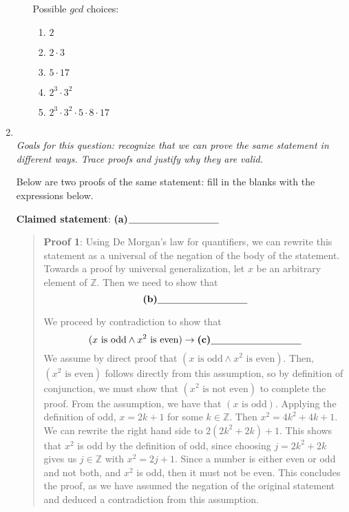 \documentclass[12pt, oneside]{article}
\begin{document}
\begin{enumerate}
\begin{enumerate}
Possible $gcd$ choices:
\begin{enumerate}
\item $2$
\item $2 \cdot 3$
\item $5 \cdot 17$
\item $2^3 \cdot 3^2$
\item $2^3 \cdot 3^2 \cdot 5 \cdot 8 \cdot 17$
\end{enumerate}
\end{enumerate} \newpage
\item \hspace{1in}\\ 

{\it Goals for this question: recognize that we can prove the same statement
in different ways.  Trace proofs and justify why they are valid.}

Below are two proofs of the same statement: fill in the blanks with the 
expressions below.

{\bf Claimed statement}:  \textbf{(a)}$\underline{\phantom{\hspace{1.3in}}}$
\begin{quote}

{\bf Proof 1}: Using De Morgan's law for quantifiers, 
we can rewrite this statement as a universal of the negation of the body of the statement.
Towards a proof by universal generalization, let $x$ be an arbitrary element of $\mathbb{Z}$. Then we need to show that
$$\textbf{(b)}\underline{\phantom{\hspace{1.3in}}}$$

We proceed by contradiction to show that $$(x \textrm{ is odd} \land x^2 \textrm{ is even}) \to \textbf{(c)}\underline{\phantom{\hspace{1.3in}}}$$
We assume by direct proof that $(x \textrm{ is odd} \land x^2 \textrm{ is even})$. Then, $(x^2 \textrm{ is even})$ follows directly from this assumption, so by definition 
of conjunction, we must show that $(x^2 \textrm{ is not even})$ to complete the proof.
From the assumption, we have that $(x \textrm{ is odd})$.  Applying the definition of odd, $x = 2k + 1$ for some $k \in \mathbb{Z}$. Then $x^2 = 4k^2 + 4k + 1$. We can rewrite the right hand side to $2(2k^2 + 2k) + 1$. This shows that $x^2$ is odd by the definition of odd, since choosing $j = 2k^2 + 2k$ gives us $j \in \mathbb{Z}$ with $x^2 = 2j + 1$. Since a number is either even or odd and not both, and $x^2$ is odd, then it must not be even. 
This concludes the proof, as we have assumed the negation of the original statement and deduced a contradiction
from this assumption.
\end{quote}


\end{enumerate}
\end{document}

